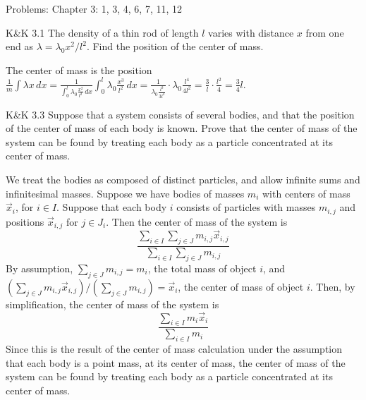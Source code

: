 \documentclass{esg8012pset}
\date{October 1}
\renewcommand{\d}{\,d}
\begin{document}
\noindent Problems: Chapter 3: 1, 3, 4, 6, 7, 11, 12

\begin{problem}{K\&K 3.1}
  The density of a thin rod of length $l$ varies with distance $x$ from one end as $\lambda = \lambda_0 x^2 / l^2$.  Find the position of the center of mass.
\end{problem}
\begin{solution}
  The center of mass is the position $\displaystyle \frac{1}{m} \int \lambda x\d{x} = \frac{1}{\int_{0}^l \lambda_0 \frac{x^2}{l^2}\d{x}} \int_0^l \lambda_0 \frac{x^3}{l^2}\d{x} = \frac{1}{\lambda_0\frac{l^3}{3l^2}}\cdot\lambda_0\frac{l^4}{4l^2} = \frac{3}{l}\cdot \frac{l^2}{4} = \frac{3}{4}l$.
\end{solution}


\begin{problem}{K\&K 3.3}
  Suppose that a system consists of several bodies, and that the position of the center of mass of each body is known. Prove that the center of mass of the system can be found by treating each body as a particle concentrated at its center of mass.
\end{problem}
\begin{solution}
  We treat the bodies as composed of distinct particles, and allow infinite sums and infinitesimal masses.  Suppose we have bodies of masses $m_i$ with centers of mass $\vec x_i$, for $i\in I$.  Suppose that each body $i$ consists of particles with masses $m_{i, j}$ and positions $\vec x_{i, j}$ for $j\in J_i$.  Then the center of mass of the system is 
  $$\frac{\displaystyle \sum_{i\in I} \sum_{j\in J} m_{i, j}\vec x_{i, j}}{\displaystyle \sum_{i\in I} \sum_{j\in J} m_{i, j}}$$
  By assumption, $\sum_{j\in J} m_{i, j} = m_i$, the total mass of object $i$, and $\left(\sum_{j\in J} m_{i, j}\vec x_{i, j}\right) / \left(\sum_{j\in J} m_{i, j}\right) = \vec x_i$, the center of mass of object $i$.  Then, by simplification, the center of mass of the system is 
  $$\frac{\displaystyle \sum_{i\in I} m_i \vec x_i}{\displaystyle \sum_{i\in I} m_i}$$
  Since this is the result of the center of mass calculation under the assumption that each body is a point mass, at its center of mass, the center of mass of the system can be found by treating each body as a particle concentrated at its center of mass.
\end{solution}
\end{document}

